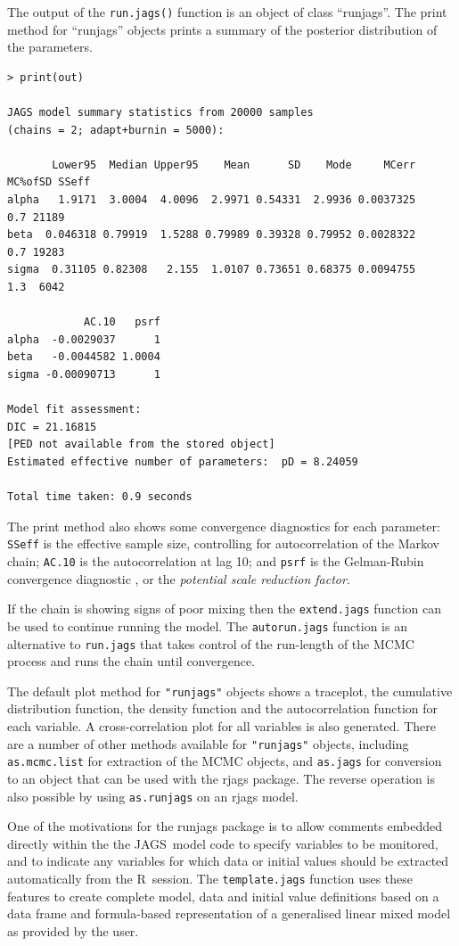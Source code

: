 \documentclass[11pt, a4paper, titlepage]{report}
\newcommand{\JAGS}{\textsf{JAGS}}
\newcommand{\R}{\textsf{R}}
\begin{document}
The output of the \texttt{run.jags()} function is an object of class
``runjags''. The print method for ``runjags'' objects prints a summary
of the posterior distribution of the parameters.
\begin{verbatim}
> print(out)

JAGS model summary statistics from 20000 samples 
(chains = 2; adapt+burnin = 5000):

       Lower95  Median Upper95    Mean      SD    Mode     MCerr MC%ofSD SSeff
alpha   1.9171  3.0004  4.0096  2.9971 0.54331  2.9936 0.0037325     0.7 21189
beta  0.046318 0.79919  1.5288 0.79989 0.39328 0.79952 0.0028322     0.7 19283
sigma  0.31105 0.82308   2.155  1.0107 0.73651 0.68375 0.0094755     1.3  6042

            AC.10   psrf
alpha  -0.0029037      1
beta   -0.0044582 1.0004
sigma -0.00090713      1

Model fit assessment:
DIC = 21.16815
[PED not available from the stored object]
Estimated effective number of parameters:  pD = 8.24059

Total time taken: 0.9 seconds
\end{verbatim}
The print method also shows some convergence diagnostics for each
parameter: \texttt{SSeff} is the effective sample size, controlling
for autocorrelation of the Markov chain; \texttt{AC.10} is the autocorrelation
at lag 10; and \texttt{psrf} is the Gelman-Rubin convergence diagnostic
\citep{GelmanRubin1992}, or the {\em potential scale reduction factor}.

If the chain is showing signs of poor mixing then the
\texttt{extend.jags} function can be used to continue running the
model. The \texttt{autorun.jags} function is an alternative to
\texttt{run.jags} that takes control of the run-length of the MCMC
process and runs the chain until convergence.

The default plot method for \texttt{"runjags"} objects shows a
traceplot, the cumulative distribution function, the density function
and the autocorrelation function for each variable. A
cross-correlation plot for all variables is also generated.  There are
a number of other methods available for \texttt{"runjags"} objects,
including \texttt{as.mcmc.list} for extraction of the MCMC objects,
and \texttt{as.jags} for conversion to an object that can be used with
the rjags package.  The reverse operation is also possible by using
\texttt{as.runjags} on an rjags model.

One of the motivations for the runjags package is to allow comments
embedded directly within the the \JAGS\ model code to specify 
variables to be monitored, and to indicate any variables for which data 
or initial values should be extracted automatically from the \R\ session.  
The \texttt{template.jags} function uses these features to create 
complete model, data and initial value definitions based on a data
frame and formula-based representation of a generalised linear mixed 
model as provided by the user.
\end{document}
